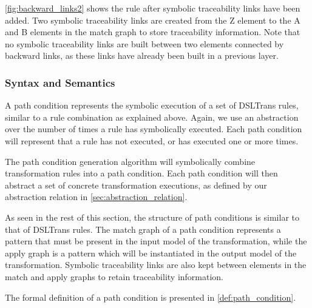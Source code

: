 \cref{fig:backward_links2} shows the rule after symbolic traceability links have been added. Two symbolic traceability links are created from the Z element to the A and B elements in the match graph to store traceability information. Note that no symbolic traceability links are built between two elements connected by backward links, as these links have already been built in a previous layer.



% 


\subsubsection{Syntax and Semantics}
\label{subsubsec:path_condition_creation}

A path condition represents the symbolic execution of a set of DSLTrans rules, similar to a rule combination as explained above. Again, we use an abstraction over the number of times a rule has symbolically executed. Each path condition will represent that a rule has not executed, or has executed one or more times.

The path condition generation algorithm will symbolically combine transformation rules into a path condition. Each path condition will then abstract a set of concrete transformation executions, as defined by our abstraction relation in \cref{sec:abstraction_relation}.

As seen in the rest of this section, the structure of path conditions is similar to that of DSLTrans rules. The match graph of a path condition represents a pattern that must be present in the input model of the transformation, while the apply graph is a pattern which will be instantiated in the output model of the transformation. Symbolic traceability links are also kept between elements in the match and apply graphs to retain traceability information.

The formal definition of a path condition is presented in \cref{def:path_condition}.

